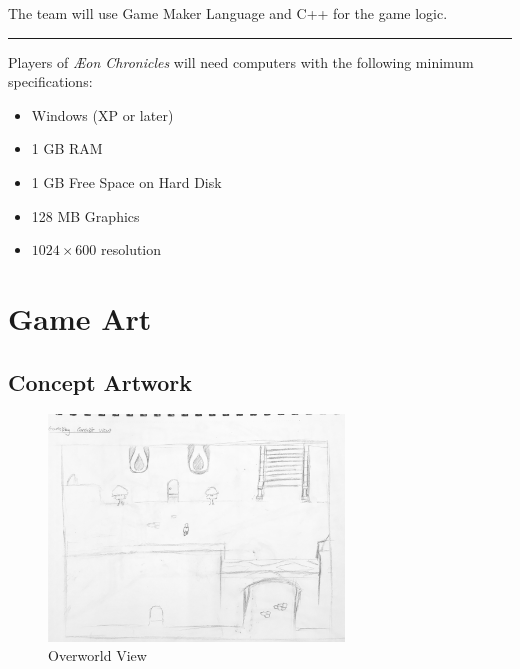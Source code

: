 \documentclass[12pt,titlepage]{article}
\newcommand\gametitle{\textit{\AE on Chronicles}\xspace}
\newcommand\sep{\rule{2.5in}{0.1mm}}
\begin{document}
The team will use Game Maker Language and C++ for the game logic.

\sep

Players of \gametitle will need computers with the following minimum
specifications:

\begin{itemize}
    \item Windows (XP or later)
    \item 1 GB RAM
    \item 1 GB Free Space on Hard Disk
    \item 128 MB Graphics
    \item $1024 \times 600$ resolution
\end{itemize}

\newpage
\section{Game Art}
%

\subsection{Concept Artwork}\label{sec:concept_art}

\begin{figure}[H]
    \caption{Overworld View}
    \label{fig:city_overworld}
    \centering
    \includegraphics[width=0.7\textwidth]{../../graphics/city_overworld}
\end{figure}

\end{document}
